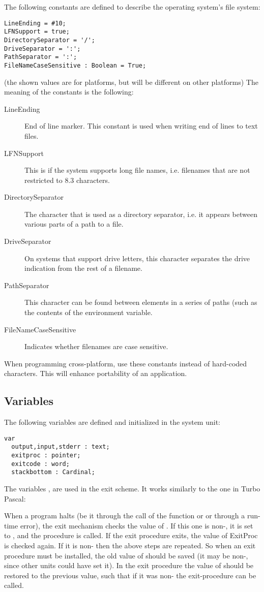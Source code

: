 The following constants are defined to describe the operating system's file
system:
\begin{verbatim}
LineEnding = #10;
LFNSupport = true;
DirectorySeparator = '/';
DriveSeparator = ':';
PathSeparator = ':';
FileNameCaseSensitive : Boolean = True;
\end{verbatim}
(the shown values are for \unix platforms, but will be different on other
platforms)
The meaning of the constants is the following:
\begin{description}
\item[LineEnding] End of line marker. This constant is used when writing end
of lines to text files.
\item[LFNSupport] This is  if the system supports long file names,
i.e. filenames that are not restricted to 8.3 characters.
\item[DirectorySeparator] The character that is used as a directory
separator, i.e. it appears between various parts of a path to a file.
\item[DriveSeparator] On systems that support drive letters, this character
separates the drive indication from the rest of a filename.
\item[PathSeparator] This character can be found between elements in a
series of paths (such as the contents of the  environment
variable.
\item[FileNameCaseSensitive] Indicates whether filenames are case sensitive.
\end{description}
When programming cross-platform, use these constants instead of hard-coded
characters. This will enhance portability of an application.

\subsection{Variables}
The following variables are defined and initialized in the system unit:
\begin{verbatim}
var
  output,input,stderr : text;
  exitproc : pointer;
  exitcode : word;
  stackbottom : Cardinal;
\end{verbatim}
The variables ,  are used in the \fpc exit
scheme. It works similarly to the one in Turbo Pascal:

When a program halts (be it through the call of the  function or
 or through a run-time error), the exit mechanism checks the value
of . If this one is non-, it is set to , and
the procedure is called. If the exit procedure exits, the value of ExitProc
is checked again. If it is non- then the above steps are repeated.
So when an exit procedure must be installed, the old value of 
should be saved (it may be non-, since other units could have set
it). In the exit procedure the value of  should be restored to
the previous value, such that if it was non- the exit-procedure can be
called.

